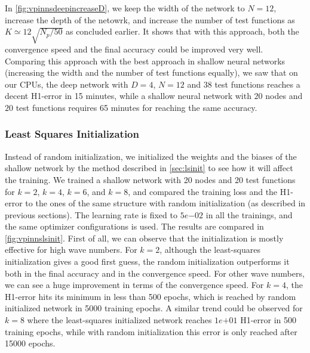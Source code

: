 In \autoref{fig:vpinnsdeepincreaseD}, we keep the width of the network to $N=12$, increase the depth of the netowrk, and increase the number of test functions as $K \simeq 12\sqrt{N_p/50}$ as concluded earlier. It shows that with this approach, both the convergence speed and the final accuracy could be improved very well. Comparing this approach with the best approach in shallow neural networks (increasing the width and the number of test functions equally), we saw that on our CPUs, the deep network with $D=4$, $N=12$ and 38 test functions reaches a decent H1-error in 15 minutes, while a shallow neural network with $20$ nodes and $20$ test functions requires 65 minutes for reaching the same accuracy.

\subsubsection{Least Squares Initialization} \label{sec:lsinitresults}
Instead of random initialization, we initialized the weights and the biases of the shallow network by the method described in \autoref{sec:lsinit} to see how it will affect the training. We trained a shallow network with 20 nodes and 20 test functions for $k=2$, $k=4$, $k=6$, and $k=8$, and compared the training loss and the H1-error to the ones of the same structure with random initialization (as described in previous sections). The learning rate is fixed to $5e{-02}$ in all the trainings, and the same optimizer configurations is used. The results are compared in \autoref{fig:vpinnslsinit}. First of all, we can observe that the initialization is mostly effective for high wave numbers. For $k=2$, although the least-squares initialization gives a good first guess, the random initialization outperforms it both in the final accuracy and in the convergence speed. For other wave numbers, we can see a huge improvement in terms of the convergence speed. For $k=4$, the H1-error hits its minimum in less than 500 epochs, which is reached by random initialized network in 5000 training epochs. A similar trend could be observed for $k=8$ where the least-squares initialized network reaches $1e{+01}$ H1-error in 500 training epochs, while with random initialization this error is only reached after 15000 epochs.

